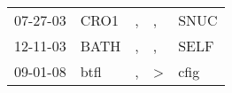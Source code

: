\begin{supertabular}{lllll}
 07-27-03 &  CRO1 &  , &             , &  SNUC \\
 12-11-03 &  BATH &  , &             , &  SELF \\
 09-01-08 &  btfl &  , &  \textgreater &  cfig \\
\end{supertabular}
